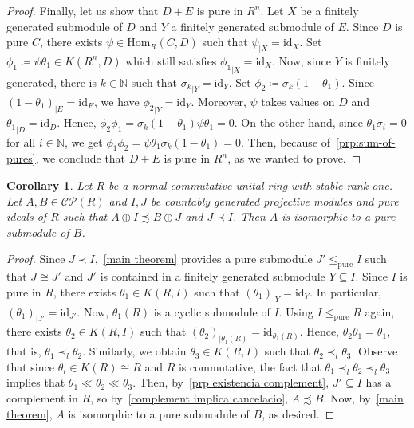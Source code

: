 \documentclass[11pt]{amsart}
\numberwithin{equation}{section}
\newtheorem{cor}[corCt]{Corollary}
\theoremstyle{definition}
\newcommand{\N}{\mathbb{N}}
\theoremstyle{plain}
\theoremstyle{definition}
\begin{document}
\begin{proof}
Finally, let us show that $D + E$ is pure in $R^n$. Let $X$ be a finitely generated submodule of $D$ and $Y$ a finitely generated submodule of $E$. Since $D$ is pure $C$, there exists $\psi \in \mathrm{Hom}_R(C, D)$ such that ${\psi}_{|X} = \mathrm{id}_X$. Set $\phi_1 \coloneqq \psi\theta_1 \in K(R^n, D)$ which still satisfies ${\phi_1}_{|X} = \mathrm{id}_X$.  Now, since $Y$ is finitely generated, there is $k \in \mathbb{N}$ such that ${\sigma_k}_{|Y} = \mathrm{id}_Y$. Set $\phi_2 \coloneqq \sigma_k(1 - \theta_1)$. Since ${(1 - \theta_1)}_{|E} = \mathrm{id}_{E}$, we have ${\phi_2}_{|Y} = \mathrm{id}_{Y}$. Moreover, $\psi$ takes values on $D$ and ${\theta_1}_{|D} = \mathrm{id}_D$. Hence, $\phi_2\phi_1 = \sigma_k(1 - \theta_1)\psi\theta_1 = 0$. On the other hand, since $ \theta_1 \sigma_i = 0$ for all $i\in \N$, we get $\phi_1\phi_2 = \psi\theta_1\sigma_k(1 - \theta_1) = 0$. Then, because of~\autoref{prp:sum-of-pures}, we conclude that $D + E$ is pure in $R^n$, as we wanted to prove. 
\end{proof}

\begin{cor}
\label{cor:complement}
Let $R$ be a normal commutative unital ring with stable rank one. Let $A, B \in \mathcal{CP}(R)$ and $I, J$ be countably generated projective modules and pure ideals of $R$ such that $A \oplus I \precsim B \oplus J$ and $J \prec I$. Then $A$ is isomorphic to a pure submodule of $B$.
\end{cor}

\begin{proof}
Since $J \prec I$,~\autoref{main theorem} provides a pure submodule $J' \leq_{\mathrm{pure}} I$ such that $J \cong J'$ and $J'$ is contained in a finitely generated submodule $Y \subseteq I$. Since $I$ is pure in $R$, there exists $\theta_1 \in K(R, I)$ such that $(\theta_1)_{|Y} = \mathrm{id}_Y$. In particular, $(\theta_1)_{|J'} = \mathrm{id}_{J'}$. Now, $\theta_1(R)$ is a cyclic submodule of $I$. Using $I \leq_{\mathrm{pure}} R$ again, there exists $\theta_2 \in K(R, I)$ such that $(\theta_2)_{|\theta_1(R)} = \mathrm{id}_{\theta_1(R)}$. Hence, $\theta_2\theta_1 = \theta_1$, that is, $\theta_1 \prec_l \theta_2$. Similarly, we obtain $\theta_3 \in K(R, I)$ such that $\theta_2 \prec_l \theta_3$. Observe that since $\theta_i \in K(R)\cong R$ and $R$ is commutative, the fact that $\theta_1 \prec_l \theta_2 \prec_l \theta_3$ implies that $\theta_1 \ll \theta_2 \ll \theta_3$. Then, by~\autoref{prp existencia complement}, $J' \subseteq I$ has a complement in $R$, so by~\autoref{complement implica cancelacio}, $A \precsim B$. Now, by~\autoref{main theorem}, $A$ is isomorphic to a pure submodule of $B$, as desired.
\end{proof}
\end{document}
